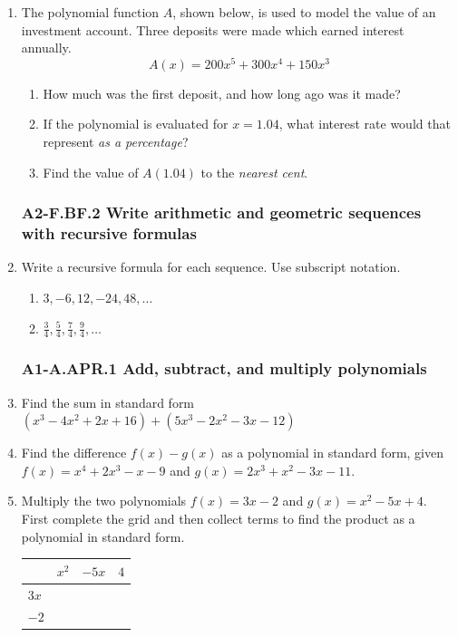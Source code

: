 \documentclass[12pt, twoside]{article}
\begin{document}
\begin{enumerate}
    \item The polynomial function $A$, shown below, is used to model the value of an investment account. Three deposits were made which earned interest annually.  $$A(x)=200x^5+300x^4+150x^3$$ 
    \begin{enumerate}[itemsep=1cm]
        \item How much was the first deposit, and how long ago was it made? \vspace{1cm}
        \item If the polynomial is evaluated for $x = 1.04$, what interest rate would that represent \emph{as a percentage}?
        \item Find the value of $A(1.04)$ to the \emph{nearest cent}. \vspace{2cm}
    \end{enumerate}

\subsubsection*{A2-F.BF.2 Write arithmetic and geometric sequences with recursive formulas}
\item Write a recursive formula for each sequence. Use subscript notation.
    \begin{multicols}{2}
    \begin{enumerate}
        \item $3, -6, 12, -24, 48, \dots$
        \item $\displaystyle \frac{3}{4}, \frac{5}{4}, \frac{7}{4}, \frac{9}{4},  \dots$ 
    \end{enumerate}
    \end{multicols}

\newpage
\subsubsection*{A1-A.APR.1 Add, subtract, and multiply polynomials}

\item Find the sum in standard form $(x^3-4x^2+2x+16)+(5x^3-2x^2-3x-12)$ \vspace{2cm}

\item Find the difference $f(x)-g(x)$ as a polynomial in standard form, given \\[0.25cm]
    $f(x)=x^4+2x^3-x-9$ and $g(x)=2x^3+x^2-3x-11$. \vspace{4cm}

\item Multiply the two polynomials $f(x)=3x-2$ and $g(x)=x^2-5x+4$. First complete the grid and then collect terms to find the product as a polynomial in standard form. \\[0.25cm]
\begin{tabular}{|p{1cm}|p{3cm}|p{3cm}|p{3cm}|}
    \hline
     & $x^2$ & $-5x$ & $4$ \\
    \hline
    $3x$ &  & & \\[0.5cm]
    \hline
    $-2$ &  & & \\[0.5cm]
    \hline
\end{tabular} \vspace{4cm}


\end{enumerate}
\end{document}
